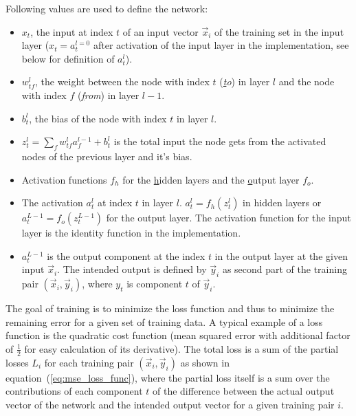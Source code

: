 Following values are used to define the network:
\begin{itemize}
    \item $x_t$, the input at index $t$ of an input vector $\vec{x}_i$ of the training set
    in the input layer ($x_t = a^{l=0}_t$ after activation of the input layer in the
    implementation, see below for definition of $a^l_t$).

    \item $w^l_{tf}$, the weight between the node with index $t$ (\emph{\underline{t}o})
    in layer $l$ and the node with index $f$ (\emph{\underline{f}rom}) in layer $l-1$.

    \item $b^l_t$, the bias of the node with index $t$ in layer $l$.
    
    \item $z^l_t = \sum_{f}{w^l_{tf} a^{l-1}_f} + b^l_t$ is the total input the node gets
    from the activated nodes of the previous layer and it's bias.
    
    \item Activation functions $f_h$ for the \underline{h}idden layers and the
    \underline{o}utput layer $f_o$.
    
    \item The activation $a^l_t$ at index $t$ in layer $l$. $a^l_t = f_h(z^l_t)$ in hidden
    layers or $a^{L-1}_t = f_o(z^{L-1}_t)$ for the output layer. The activation function
    for the input layer is the identity function in the implementation.

    \item $a^{L-1}_t$ is the output component at the index $t$ in the output layer at the
    given input $\vec{x}_i$. The intended output is defined by $\vec{y}_i$ as second part
    of the training pair $(\vec{x}_i, \vec{y}_i)$, where $y_t$ is component $t$ of
    $\vec{y}_i$.
\end{itemize}

The goal of training is to minimize the loss function and thus to minimize the remaining
error for a given set of training data.  A typical example of a loss function is the
quadratic cost function (mean squared error with additional factor of $\frac{1}{2}$ for
easy calculation of its derivative). The total loss is a sum of the partial losses $L_i$
for each training pair $(\vec{x}_i, \vec{y}_i)$ as shown in
equation~(\ref{eq:mse_loss_func}), where the partial loss itself is a sum over the
contributions of each component $t$ of the difference between the actual output vector of
the network and the intended output vector for a given training pair $i$.

